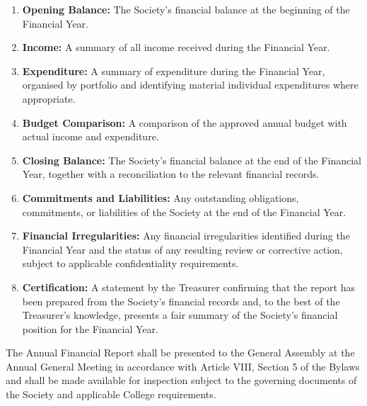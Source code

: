 \documentclass[a4paper]{article}
\begin{document}
\begin{enumerate}
    \item \textbf{Opening Balance:} The Society's financial balance at
    the beginning of the Financial Year.

    \item \textbf{Income:} A summary of all income received during the
    Financial Year.

    \item \textbf{Expenditure:} A summary of expenditure during the
    Financial Year, organised by portfolio and identifying material
    individual expenditures where appropriate.

    \item \textbf{Budget Comparison:} A comparison of the approved
    annual budget with actual income and expenditure.

    \item \textbf{Closing Balance:} The Society's financial balance at
    the end of the Financial Year, together with a reconciliation to
    the relevant financial records.

    \item \textbf{Commitments and Liabilities:} Any outstanding
    obligations, commitments, or liabilities of the Society at the end
    of the Financial Year.

    \item \textbf{Financial Irregularities:} Any financial
    irregularities identified during the Financial Year and the status
    of any resulting review or corrective action, subject to applicable
    confidentiality requirements.

    \item \textbf{Certification:} A statement by the Treasurer
    confirming that the report has been prepared from the Society's
    financial records and, to the best of the Treasurer's knowledge,
    presents a fair summary of the Society's financial position for
    the Financial Year.
\end{enumerate}

The Annual Financial Report shall be presented to the General Assembly
at the Annual General Meeting in accordance with Article VIII,
Section 5 of the Bylaws and shall be made available for inspection
subject to the governing documents of the Society and applicable
College requirements.
\end{document}
